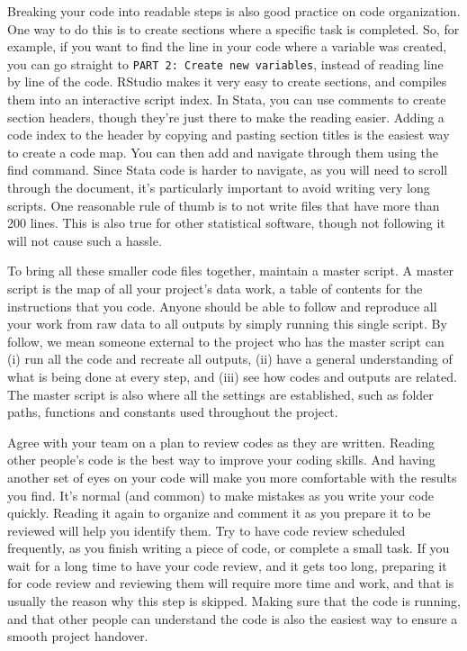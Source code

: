 Breaking your code into readable steps is also good practice on code organization. 
One way to do this is to create sections where a specific task is completed. 
So, for example, if you want to find the line in your code where a variable was created, 
you can go straight to \texttt{PART 2: Create new variables}, 
instead of reading line by line of the code.
RStudio makes it very easy to create sections, and compiles them into an interactive script index. 
In Stata, you can use comments to create section headers, 
though they're just there to make the reading easier. 
Adding a code index to the header by copying and pasting section titles is the easiest way to create a code map.
You can then add and navigate through them using the find command. 
Since Stata code is harder to navigate, as you will need to scroll through the document,
it's particularly important to avoid writing very long scripts. 
One reasonable rule of thumb is to not write files that have more than 200 lines. 
This is also true for other statistical software, 
though not following it will not cause such a hassle.

To bring all these smaller code files together, maintain a master script.
A master script is the map of all your project's data work, 
a table of contents for the instructions that you code.
Anyone should be able to follow and reproduce all your work from
raw data to all outputs by simply running this single script.
By follow, we mean someone external to the project who has the master script can 
(i) run all the code and recreate all outputs, 
(ii) have a general understanding of what is being done at every step, and
(iii) see how codes and outputs are related. 
The master script is also where all the settings are established, 
such as folder paths, functions and constants used throughout the project.

Agree with your team on a plan to review codes 
as they are written. 
Reading other people's code is the best way to improve your coding skills. 
And having another set of eyes on your code will make you more comfortable with the results you find. 
It's normal (and common) to make mistakes as you write your code quickly. 
Reading it again to organize and comment it as you prepare it to be reviewed will help you identify them.
Try to have code review scheduled frequently, as you finish writing a piece of code, or complete a small task.
If you wait for a long time to have your code review, and it gets too long, 
preparing it for code review and reviewing them will require more time and work, 
and that is usually the reason why this step is skipped. 
Making sure that the code is running, 
and that other people can understand the code is also the easiest way to ensure a smooth project handover.


